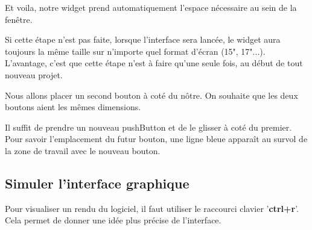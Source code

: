 \documentclass[12pt]{report}    %
\begin{document}


Et voila, notre widget prend automatiquement l'espace nécessaire au sein de la fenêtre. \newline





Si cette étape n'est pas faite, lorsque l'interface sera lancée, le widget aura toujours la même taille sur n'importe quel format d'écran (15", 17"...). L'avantage, c'est que cette étape n'est à faire qu'une seule fois, au début de tout nouveau projet. \newline

Nous allons placer un second bouton à coté du nôtre. On souhaite que les deux boutons aient les mêmes dimensions.

Il suffit de prendre un nouveau pushButton et de le glisser à coté du premier. Pour savoir l'emplacement du futur bouton, une ligne bleue apparaît au survol de la zone de travail avec le nouveau bouton.




{\color{red}}

\subsection{Simuler l'interface graphique}

Pour visualiser un rendu du logiciel, il faut utiliser le raccourci clavier '\textbf{ctrl+r}'. \newline Cela permet de donner une idée plus précise de l'interface.

\end{document}
